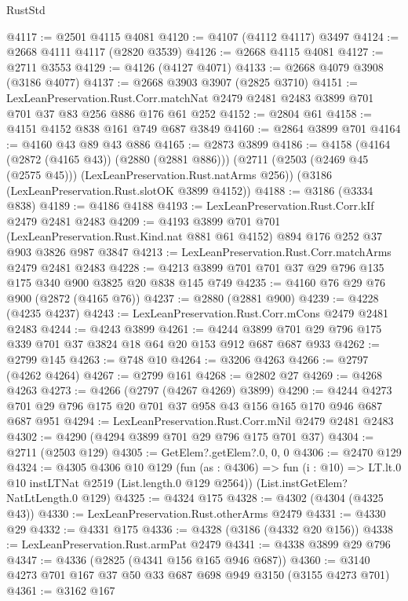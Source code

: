 \begin{lexlean}{RustStd}
\begin{coremodule}
{\begin{coremodule}
{{{{{{{{{{{{{{{{{{{{@4117 := @2501 @4115 @4081
@4120 := @4107 (@4112 @4117) @3497
@4124 := @2668 @4111 @4117 (@2820 @3539)
@4126 := @2668 @4115 @4081
@4127 := @2711 @3553
@4129 := @4126 (@4127 @4071)
@4133 := @2668 @4079 @3908 (@3186 @4077)
@4137 := @2668 @3903 @3907 (@2825 @3710)
@4151 := LexLeanPreservation.Rust.Corr.matchNat
    @2479
    @2481
    @2483
    @3899
    @701
    @701
    @37
    @83
    @256
    @886
    @176
    @61
    @252
@4152 := @2804 @61
@4158 := @4151 @4152 @838 @161 @749 @687 @3849
@4160 := @2864 @3899 @701
@4164 := @4160 @43 @89 @43 @886
@4165 := @2873 @3899
@4186 := @4158
    (@4164 (@2872 (@4165 @43)) (@2880 (@2881 @886)))
    (@2711 (@2503 (@2469 @45 (@2575 @45))) (LexLeanPreservation.Rust.natArms @256))
    (@3186 (LexLeanPreservation.Rust.slotOK @3899 @4152))
@4188 := @3186 (@3334 @838)
@4189 := @4186 @4188
@4193 := LexLeanPreservation.Rust.Corr.kIf @2479 @2481 @2483
@4209 := @4193
    @3899
    @701
    @701
    (LexLeanPreservation.Rust.Kind.nat @881 @61 @4152)
    @894
    @176
    @252
    @37
    @903
    @3826
    @987
    @3847
@4213 := LexLeanPreservation.Rust.Corr.matchArms @2479 @2481 @2483
@4228 := @4213 @3899 @701 @701 @37 @29 @796 @135 @175 @340 @900 @3825 @20 @838 @145 @749
@4235 := @4160 @76 @29 @76 @900 (@2872 (@4165 @76))
@4237 := @2880 (@2881 @900)
@4239 := @4228 (@4235 @4237)
@4243 := LexLeanPreservation.Rust.Corr.mCons @2479 @2481 @2483
@4244 := @4243 @3899
@4261 := @4244 @3899 @701 @29 @796 @175 @339 @701 @37 @3824 @18 @64 @20 @153 @912 @687 @687 @933
@4262 := @2799 @145
@4263 := @748 @10
@4264 := @3206 @4263
@4266 := @2797 (@4262 @4264)
@4267 := @2799 @161
@4268 := @2802 @27
@4269 := @4268 @4263
@4273 := @4266 (@2797 (@4267 @4269) @3899)
@4290 := @4244 @4273 @701 @29 @796 @175 @20 @701 @37 @958 @43 @156 @165 @170 @946 @687 @687 @951
@4294 := LexLeanPreservation.Rust.Corr.mNil @2479 @2481 @2483
@4302 := @4290 (@4294 @3899 @701 @29 @796 @175 @701 @37)
@4304 := @2711 (@2503 @129)
@4305 := GetElem?.getElem?.{0, 0, 0}
@4306 := @2470 @129
@4324 := @4305
    @4306
    @10
    @129
    (fun (as : @4306) =>
    fun (i : @10) => LT.lt.{0} @10 instLTNat @2519 (List.length.{0} @129 @2564))
    (List.instGetElem?NatLtLength.{0} @129)
@4325 := @4324 @175
@4328 := @4302 (@4304 (@4325 @43))
@4330 := LexLeanPreservation.Rust.otherArms @2479
@4331 := @4330 @29
@4332 := @4331 @175
@4336 := @4328 (@3186 (@4332 @20 @156))
@4338 := LexLeanPreservation.Rust.armPat @2479
@4341 := @4338 @3899 @29 @796
@4347 := @4336 (@2825 (@4341 @156 @165 @946 @687))
@4360 := @3140 @4273 @701 @167 @37 @50 @33 @687 @698 @949 @3150 (@3155 @4273 @701)
@4361 := @3162 @167
}}}}}}}}}}}}}}}}}}}}
\end{coremodule}}
\end{coremodule}
\end{lexlean}
